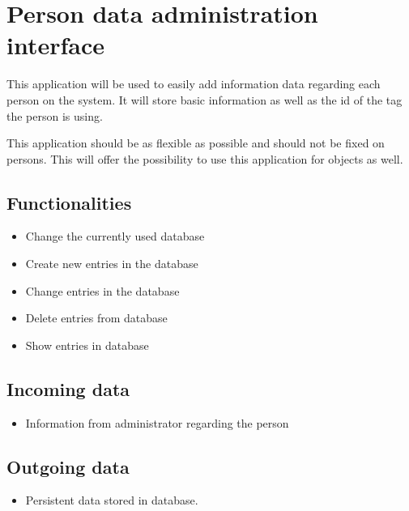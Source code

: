   \section{Person data administration interface}
   \label{sec:design:personDataAdmin}
   This application will be used to easily add information data regarding each person on the system. It will store basic information as well as the id of the tag the person is using.

   This application should be as flexible as possible and should not be fixed on persons. This will offer the possibility to use this application for objects as well.

   \subsection{Functionalities}
    \begin{itemize}
     \item Change the currently used database
     \item Create new entries in the database
     \item Change entries in the database
     \item Delete entries from database
     \item Show entries in database
    \end{itemize}

   \subsection{Incoming data}
    \begin{itemize}
     \item Information from administrator regarding the person
    \end{itemize}

   \subsection{Outgoing data}
    \begin{itemize}
     \item Persistent data stored in database.
    \end{itemize}

